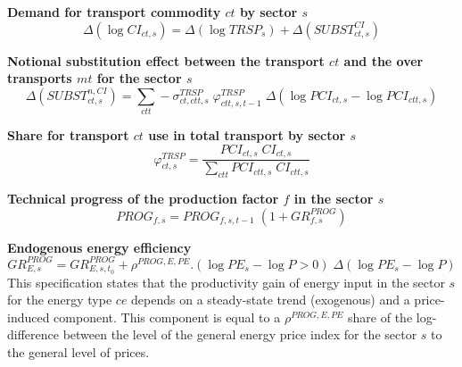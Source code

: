 \documentclass[12pt]{article}
\numberwithin{equation}{section}
\begin{document}
\noindent\textbf{Demand for transport commodity $ct$ by sector $s$} \\
\begin{dmath}
\varDelta \left(\operatorname{log} CI_{ct, s}\right) = \varDelta \left(\operatorname{log} TRSP_{s}\right) + \varDelta \left(SUBST^{CI}_{ct, s}\right)
\end{dmath}

\noindent\textbf{Notional substitution effect between the transport $ct$ and the over transports $mt$ for the sector $s$} \\
\begin{dmath}
\varDelta \left(SUBST^{n,CI}_{ct, s}\right) = \sum_{ctt} -\sigma^{TRSP}_{ct, ctt, s} \; \varphi^{TRSP}_{ctt, s, t-1} \; \varDelta \left(\operatorname{log} PCI_{ct, s} - \operatorname{log} PCI_{ctt, s}\right)
\end{dmath}

\noindent\textbf{Share for transport $ct$ use in total transport by sector $s$} \\
\begin{dmath}
\varphi^{TRSP}_{ct, s} = \frac{PCI_{ct, s} \; CI_{ct, s}}{\sum_{ctt} PCI_{ctt, s} \; CI_{ctt, s}}
\end{dmath}

\noindent\textbf{Technical progress of the production factor $f$ in the sector $s$} \\
\begin{dmath}
PROG_{f, s} = PROG_{f, s, t-1} \; \left( 1 + GR^{PROG}_{f, s} \right)
\end{dmath}

\noindent\textbf{Endogenous energy efficiency} \\
\begin{dmath}
GR^{PROG}_{E, s} = GR^{PROG}_{E, s, t_{0}} + \rho^{PROG,E,PE} . \left( \operatorname{log} PE_{s} - \operatorname{log} P > 0 \right) \; \varDelta \left(\operatorname{log} PE_{s} - \operatorname{log} P\right)
\end{dmath}
This specification states that the productivity gain of energy input in the sector $s$ for the energy type $ce$ depends on a steady-state trend (exogenous) and a price-induced component. This component is equal to a  $\rho^{PROG,E,PE}$ share of the log-difference between the level of the general energy price index for the sector $s$ to the general level of prices. \\
\end{document}
